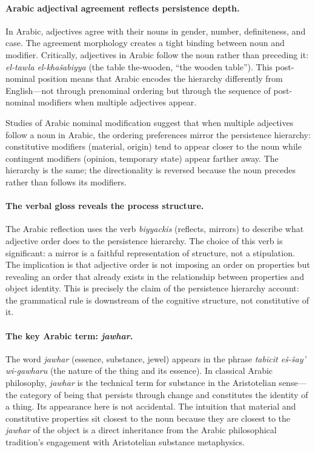\documentclass[11pt]{article}
\theoremstyle{rthm}
\theoremstyle{rdef}
\theoremstyle{remark}
\begin{document}
\paragraph{Arabic adjectival agreement reflects persistence depth.}
In Arabic, adjectives agree with their nouns in gender, number, definiteness,
and case. The agreement morphology creates a tight binding between noun and
modifier. Critically, adjectives in Arabic follow the noun rather than
preceding it: \textit{el-tawla el-kha\v{s}abiyya} (the table the-wooden, ``the
wooden table''). This post-nominal position means that Arabic encodes the
hierarchy differently from English---not through prenominal ordering but
through the sequence of post-nominal modifiers when multiple adjectives appear.

Studies of Arabic nominal modification suggest that when multiple adjectives
follow a noun in Arabic, the ordering preferences mirror the persistence
hierarchy: constitutive modifiers (material, origin) tend to appear closer to
the noun while contingent modifiers (opinion, temporary state) appear farther
away. The hierarchy is the same; the directionality is reversed because the
noun precedes rather than follows its modifiers.

\paragraph{The verbal gloss reveals the process structure.}
The Arabic reflection uses the verb \textit{biyyackis} (reflects, mirrors) to
describe what adjective order does to the persistence hierarchy. The choice of
this verb is significant: a mirror is a faithful representation of structure,
not a stipulation. The implication is that adjective order is not imposing an
order on properties but revealing an order that already exists in the
relationship between properties and object identity. This is precisely the
claim of the persistence hierarchy account: the grammatical rule is downstream
of the cognitive structure, not constitutive of it.

\paragraph{The key Arabic term: \textit{jawhar}.}
The word \textit{jawhar} (essence, substance, jewel) appears in the phrase
\textit{tab\={i}cit e\v{s}-\v{s}ay' wi-gawharu} (the nature of the thing and its essence).
In classical Arabic philosophy, \textit{jawhar} is the technical term for
substance in the Aristotelian sense---the category of being that persists
through change and constitutes the identity of a thing. Its appearance here
is not accidental. The intuition that material and constitutive properties sit
closest to the noun because they are closest to the \textit{jawhar} of the
object is a direct inheritance from the Arabic philosophical tradition's
engagement with Aristotelian substance metaphysics.
\end{document}
